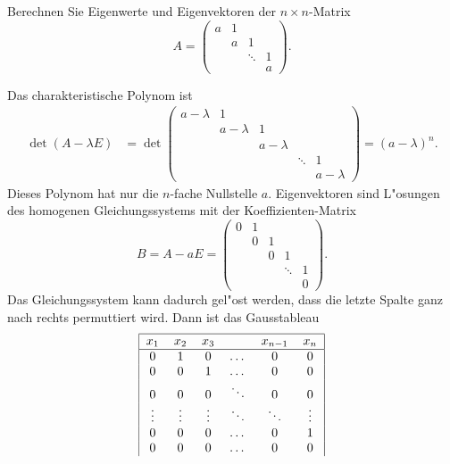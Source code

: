 Berechnen Sie Eigenwerte und Eigenvektoren der $n\times n$-Matrix
\[
A=\begin{pmatrix}
a    &1      &      &      \\
     &      a&     1&      \\
     &       &\ddots&     1\\
     &       &      &     a
\end{pmatrix}.
\]

\begin{loesung}
Das charakteristische Polynom ist
\begin{align*}
\operatorname{det}(A-\lambda E)
&=
\operatorname{det}\begin{pmatrix}
a-\lambda&        1&         &         &         \\
         &a-\lambda&        1&         &         \\
         &         &a-\lambda&         &         \\
         &         &         &\ddots   &        1\\
         &         &         &         &a-\lambda
\end{pmatrix}
=(a-\lambda)^n.
\end{align*}
Dieses Polynom hat nur die $n$-fache Nullstelle $a$.
Eigenvektoren sind L"osungen des homogenen Gleichungssystems
mit der Koeffizienten-Matrix
\[
B=A-aE=\begin{pmatrix}
0&1& &      & \\
 &0&1&      & \\
 & &0&     1& \\
 & & &\ddots&1\\
 & & &      &0
\end{pmatrix}.
\]
Das Gleichungssystem kann dadurch gel"ost werden, dass die
letzte Spalte ganz nach rechts permuttiert wird. Dann ist das
Gausstableau
\[
\begin{tabular}{|cccccc|}
\hline
$x_1$&$x_2$&$x_3$&&$x_{n-1}$&$x_n$\\
\hline
0       &1       &0       &$ \dots$&0       &0       \\
0       &0       &1       &$ \dots$&0       &0       \\
0       &0       &0       &$\ddots$&0       &0       \\
$\vdots$&$\vdots$&$\vdots$&$\ddots$&$\ddots$&$\vdots$\\
0       &0       &0       &$ \dots$&0       &1       \\
0       &0       &0       &$ \dots$&0       &0       \\

\end{tabular}\]
\end{loesung}
